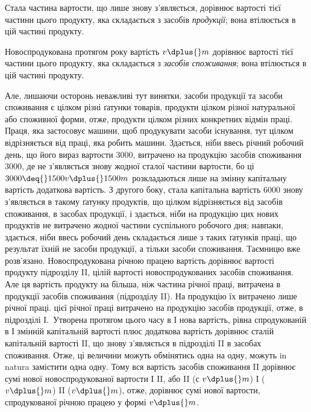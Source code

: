 
Стала частина вартости, що лише знову з’являється, дорівнює вартості
тієї частини цього продукту, яка складається з засобів \emph{продукції};
вона втілюється в цій частині продукту.

Новоспродукована протягом року вартість \deq{} $v \dplus{} m$ дорівнює вартості
тієї частини цього продукту, яка складається з \emph{засобів споживання};
вона втілюється в цій частині продукту.

Але, лишаючи осторонь неважливі тут винятки, засоби продукції та
засоби споживання є цілком різні ґатунки товарів, продукти цілком різної
натуральної або споживної форми, отже, продукти цілком різних конкретних
відмін праці. Праця, яка застосовує машини, щоб продукувати
засоби існування, тут цілком відрізняється від праці, яка робить машини.
Здається, ніби ввесь річний робочий день, що його вираз вартости \deq{} 3000,
витрачено на продукцію засобів споживання \deq{} 3000, де не з’являється
знову жодної сталої частини вартости, бо ці $3000 \deq{} 1500 v \dplus{} 1500 m$
розкладаються лише на змінну капітальну вартість \dplus{} додаткова вартість. З
другого боку, стала капітальна вартість \deq{} 6000 знову з’являється в такому
ґатунку продуктів, що цілком відрізняється від засобів споживання,
в засобах продукції, і здається, ніби на продукцію цих нових продуктів
не витрачено жодної частини суспільного робочого дня; навпаки, здається,
ніби ввесь робочий день складається лише з таких ґатунків праці, що
результат їхній не засоби продукції, а тільки засоби споживання. Таємницю
вже розв’язано. Новоспродукована річною працею вартість дорівнює
вартості продукту підрозділу II, цілій вартості новоспродукованих засобів
споживання. Але ця вартість продукту на  більша, ніж частина річної
праці, витрачена в продукції засобів споживання (підрозділу II). На продукцію
їх витрачено лише  річної праці.  цієї річної праці витрачено
на продукцію засобів продукції, отже, в підрозділі І.~Утворена протягом
цього часу в І нова вартість, рівна спродукованій в І змінній капітальній
вартості плюс додаткова вартість дорівнює сталій капітальній вартості II,
що знову з’являється в підрозділі II в засобах споживання. Отже, ці величини
можуть обмінятись одна на одну, можуть in natura замістити одна одну.
Тому вся вартість засобів споживання II дорівнює сумі нової новоспродукованої
вартости І \dplus{} II, або II ($с$ \dplus{} $v \dplus{} m$) \deq{} І ($v \dplus{} m$) \dplus{} II ($v \dplus{} m$), отже, дорівнює
сумі нової вартости, спродукованої річною працею у формі $v \dplus{} m$.

